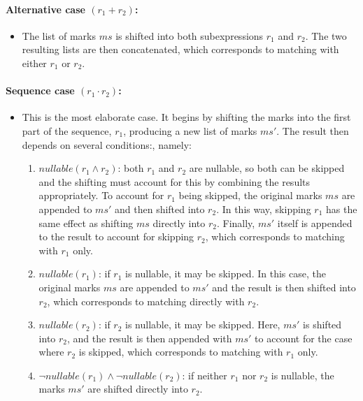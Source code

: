 \documentclass[12pt]{article}
\newcommand{\nullable}{\textit{nullable}}
\begin{document}
\paragraph*{\textbf{Alternative case} $(r_1 + r_2)$:}
\begin{itemize}
  \item The list of marks $ms$ is shifted into both subexpressions $r_1$ and $r_2$.  
        The two resulting lists are then concatenated, 
        which corresponds to matching with either $r_1$ or $r_2$.
\end{itemize}

\paragraph*{\textbf{Sequence case} $(r_1 \cdot r_2)$:}
\begin{itemize}
\item This is the most elaborate case. It begins by shifting the marks into the first part of the sequence, $r_1$, 
producing a new list of marks $ms'$. The result then depends on several conditions:, namely:
    \begin{enumerate}
      \item $\nullable(r_1 \land r_2)$: both $r_1$ and $r_2$ are nullable, 
            so both can be skipped and the shifting must account for this by combining the results appropriately. 
            To account for $r_1$ being skipped, the original marks $ms$ are appended to $ms'$ and then shifted into $r_2$.  
            In this way, skipping $r_1$ has the same effect as shifting $ms$ directly into $r_2$. 
            Finally, $ms'$ itself is appended to the result to account for skipping $r_2$, 
            which corresponds to matching with $r_1$ only.

      \item $\nullable(r_1)$: if $r_1$ is nullable, it may be skipped. 
            In this case, the original marks $ms$ are appended to $ms'$ 
            and the result is then shifted into $r_2$, 
            which corresponds to matching directly with $r_2$.

      \item $\nullable(r_2)$: if $r_2$ is nullable, it may be skipped. 
            Here, $ms'$ is shifted into $r_2$, and the result is then appended with $ms'$ 
            to account for the case where $r_2$ is skipped, 
            which corresponds to matching with $r_1$ only.

      \item $\neg\nullable(r_1) \land \neg\nullable(r_2)$: 
            if neither $r_1$ nor $r_2$ is nullable, 
            the marks $ms'$ are shifted directly into $r_2$.
    \end{enumerate}
\end{itemize}
\end{document}
